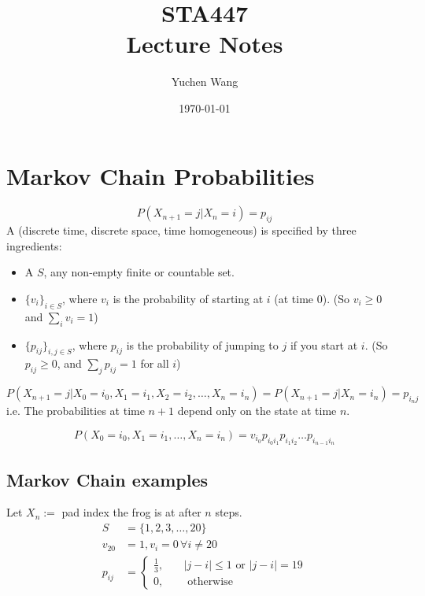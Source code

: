 \documentclass[11pt]{article}
\title{STA447\\ Lecture Notes}
\author{Yuchen Wang}
\date{\today}
\begin{document}
    \maketitle
    \tableofcontents
    \newpage


    \section{Markov Chain Probabilities}
    \notation
    $$P(X_{n+1} = j | X_n = i) = p_{ij}$$
     A (discrete time, discrete space, time homogeneous)  is specified by three ingredients:
    \begin{itemize}
    	\item A  $S$, any non-empty finite or countable set.
    	\item {} $\{v_i\}_{i \in S}$, where $v_i$ is the probability of starting at $i$ (at time 0). (So $v_i \geq 0$ and $\sum_i v_i = 1$)
    	\item {} $\{p_{ij}\}_{i, j\in S}$, where $p_{ij}$ is the probability of jumping to $j$ if you start at $i$. (So $p_{ij} \geq 0$, and $\sum_j p_{ij} = 1$ for all $i$)
    \end{itemize}
    
    $$P(X_{n+1} = j | X_0 = i_0, X_1 = i_1, X_2 = i_2, \hdots, X_n = i_n) = P(X_{n+1} = j | X_n = i_n) = p_{i_nj}$$
    i.e. The probabilities at time $n+1$ depend only on the state at time $n$.
    
    \remark
    $$P(X_0 = i_0, X_1 = i_1, \hdots, X_n = i_n) = v_{i_0}p_{i_0i_1}p_{i_1i_2} \hdots p_{i_{n-1}i_n}$$
    
    \subsection{Markov Chain examples}
    Let $X_n :=$ pad index the frog is at after $n$ steps.
    \begin{align*}
    	S &= \{1, 2, 3, \hdots, 20\}\\
    	v_{20} &= 1, v_i = 0 \, \forall i \neq 20 \\
    	p_{ij} &= \begin{cases}
    		\frac{1}{3}, \quad &|j - i| \leq 1 \text{ or } |j - i| = 19\\
    	0, \quad &\text{ otherwise }
    	\end{cases}
    \end{align*}
    
\end{document}
